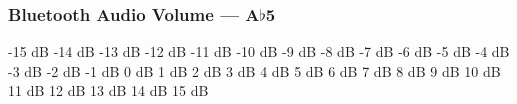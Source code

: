\subsubsection{Bluetooth Audio Volume --- \UiKey{\SET}A$\flat$5}


























-15 dB
-14 dB
-13 dB
-12 dB
-11 dB
-10 dB
-9 dB
-8 dB
-7 dB
-6 dB
-5 dB
-4 dB
-3 dB
-2 dB
-1 dB
0 dB
1 dB
2 dB
3 dB
4 dB
5 dB
6 dB
7 dB
8 dB
9 dB
10 dB
11 dB
12 dB
13 dB
14 dB
15 dB

